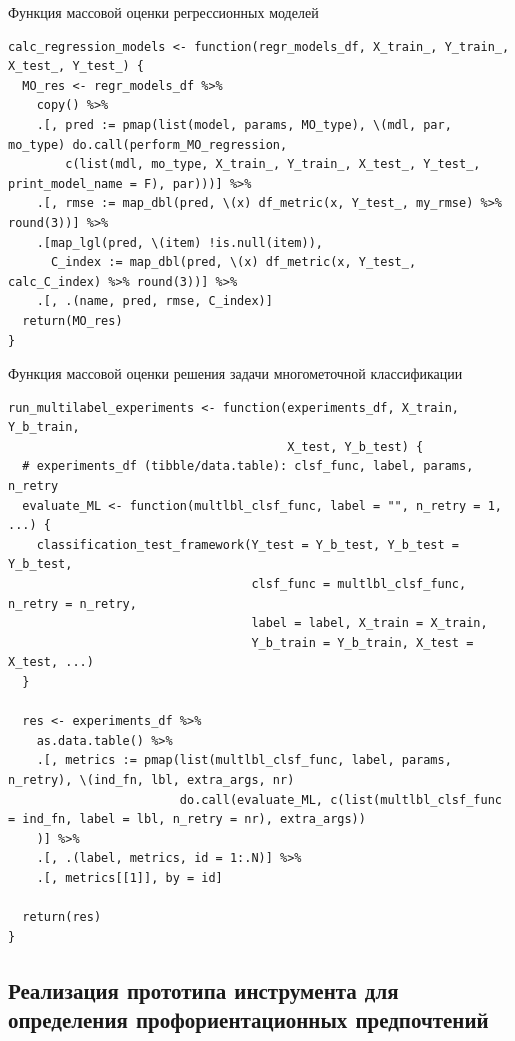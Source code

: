 \begin{listing}
    \caption{Функция массовой оценки регрессионных моделей}
    \label{lst:calc_regr}
    \begin{verbatim}
calc_regression_models <- function(regr_models_df, X_train_, Y_train_, X_test_, Y_test_) {
  MO_res <- regr_models_df %>% 
    copy() %>% 
    .[, pred := pmap(list(model, params, MO_type), \(mdl, par, mo_type) do.call(perform_MO_regression, 
        c(list(mdl, mo_type, X_train_, Y_train_, X_test_, Y_test_, print_model_name = F), par)))] %>% 
    .[, rmse := map_dbl(pred, \(x) df_metric(x, Y_test_, my_rmse) %>% round(3))] %>% 
    .[map_lgl(pred, \(item) !is.null(item)),
      C_index := map_dbl(pred, \(x) df_metric(x, Y_test_, calc_C_index) %>% round(3))] %>% 
    .[, .(name, pred, rmse, C_index)]
  return(MO_res)
}
  \end{verbatim}
\end{listing}

\begin{listing}
    \caption{Функция массовой оценки решения задачи многометочной классификации}
    \label{lst:multilabel_clsf}
    \begin{verbatim}
run_multilabel_experiments <- function(experiments_df, X_train, Y_b_train, 
                                       X_test, Y_b_test) {
  # experiments_df (tibble/data.table): clsf_func, label, params, n_retry
  evaluate_ML <- function(multlbl_clsf_func, label = "", n_retry = 1, ...) {
    classification_test_framework(Y_test = Y_b_test, Y_b_test = Y_b_test, 
                                  clsf_func = multlbl_clsf_func, n_retry = n_retry, 
                                  label = label, X_train = X_train, 
                                  Y_b_train = Y_b_train, X_test = X_test, ...)
  }
  
  res <- experiments_df %>%
    as.data.table() %>%
    .[, metrics := pmap(list(multlbl_clsf_func, label, params, n_retry), \(ind_fn, lbl, extra_args, nr) 
                        do.call(evaluate_ML, c(list(multlbl_clsf_func = ind_fn, label = lbl, n_retry = nr), extra_args))
    )] %>%
    .[, .(label, metrics, id = 1:.N)] %>%
    .[, metrics[[1]], by = id]
  
  return(res)
}
  \end{verbatim}
\end{listing}


\subsection{Реализация прототипа инструмента для определения профориентационных предпочтений}

